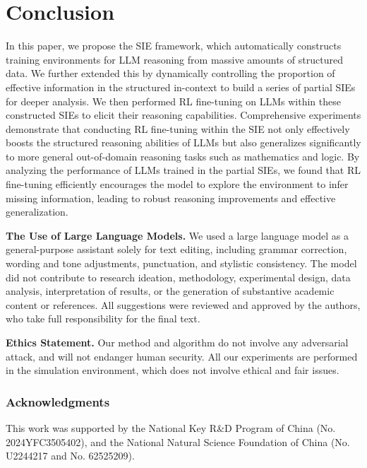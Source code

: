 \documentclass{article} %
\begin{document}
\section{Conclusion}
In this paper, we propose the SIE framework, which automatically constructs training environments for LLM reasoning from massive amounts of structured data. We further extended this by dynamically controlling the proportion of effective information in the structured in-context to build a series of partial SIEs for deeper analysis. We then performed RL fine-tuning on LLMs within these constructed SIEs to elicit their reasoning capabilities. Comprehensive experiments demonstrate that conducting RL fine-tuning within the SIE not only effectively boosts the structured reasoning abilities of LLMs but also generalizes significantly to more general out-of-domain reasoning tasks such as mathematics and logic. By analyzing the performance of LLMs trained in the partial SIEs, we found that RL fine-tuning efficiently encourages the model to explore the environment to infer missing information, leading to robust reasoning improvements and effective generalization. 







\clearpage


\textbf{The Use of Large Language Models.}
We used a large language model as a general-purpose assistant solely for text editing, including grammar correction, wording and tone adjustments, punctuation, and stylistic consistency. The model did not contribute to research ideation, methodology, experimental design, data analysis, interpretation of results, or the generation of substantive academic content or references. All suggestions were reviewed and approved by the authors, who take full responsibility for the final text. 


\textbf{Ethics Statement.}
Our method and algorithm do not involve any adversarial attack, and will not endanger human security.
All our experiments are performed in the simulation environment, which does not involve ethical and fair issues.



\subsubsection*{Acknowledgments}
This work was supported by the National Key R\&D Program of China (No. 2024YFC3505402), and the National Natural Science Foundation of China (No. U2244217 and No. 62525209). 
\end{document}
